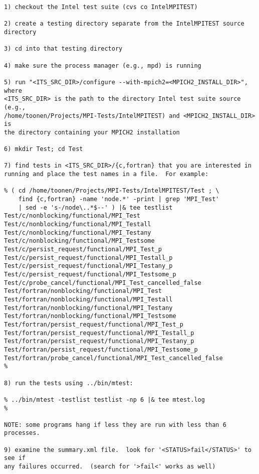 \documentclass[dvipdfm,11pt]{article}
\begin{document}
\begin{verbatim}
1) checkout the Intel test suite (cvs co IntelMPITEST)

2) create a testing directory separate from the IntelMPITEST source
directory

3) cd into that testing directory

4) make sure the process manager (e.g., mpd) is running

5) run "<ITS_SRC_DIR>/configure --with-mpich2=<MPICH2_INSTALL_DIR>", where
<ITS_SRC_DIR> is the path to the directory Intel test suite source (e.g.,
/home/toonen/Projects/MPI-Tests/IntelMPITEST) and <MPICH2_INSTALL_DIR> is
the directory containing your MPICH2 installation

6) mkdir Test; cd Test

7) find tests in <ITS_SRC_DIR>/{c,fortran} that you are interested in
running and place the test names in a file.  For example:

% ( cd /home/toonen/Projects/MPI-Tests/IntelMPITEST/Test ; \
    find {c,fortran} -name 'node.*' -print | grep 'MPI_Test' 
    | sed -e 's-/node\..*$--' ) |& tee testlist
Test/c/nonblocking/functional/MPI_Test
Test/c/nonblocking/functional/MPI_Testall
Test/c/nonblocking/functional/MPI_Testany
Test/c/nonblocking/functional/MPI_Testsome
Test/c/persist_request/functional/MPI_Test_p
Test/c/persist_request/functional/MPI_Testall_p
Test/c/persist_request/functional/MPI_Testany_p
Test/c/persist_request/functional/MPI_Testsome_p
Test/c/probe_cancel/functional/MPI_Test_cancelled_false
Test/fortran/nonblocking/functional/MPI_Test
Test/fortran/nonblocking/functional/MPI_Testall
Test/fortran/nonblocking/functional/MPI_Testany
Test/fortran/nonblocking/functional/MPI_Testsome
Test/fortran/persist_request/functional/MPI_Test_p
Test/fortran/persist_request/functional/MPI_Testall_p
Test/fortran/persist_request/functional/MPI_Testany_p
Test/fortran/persist_request/functional/MPI_Testsome_p
Test/fortran/probe_cancel/functional/MPI_Test_cancelled_false
%

8) run the tests using ../bin/mtest:

% ../bin/mtest -testlist testlist -np 6 |& tee mtest.log
%

NOTE: some programs hang if less they are run with less than 6 processes.

9) examine the summary.xml file.  look for '<STATUS>fail</STATUS>' to see if
any failures occurred.  (search for '>fail<' works as well)

\end{verbatim}
\end{document}
